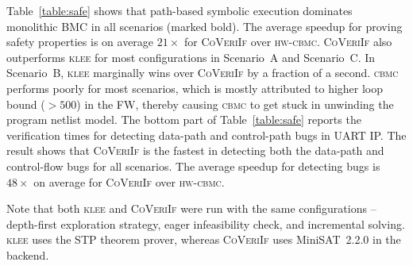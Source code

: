 \documentclass[sigconf]{acmart}
\newcommand{\tool}[1]{\textsc{#1}\xspace}
\newcommand{\cbmcv}{\tool{cbmc}}
\newcommand{\hwcbmcv}{\tool{hw-cbmc}}
\newcommand{\verifox}{\tool{CoVeriIf}}
\newcommand{\klee}{\tool{klee}}
\newcommand{\Omit}[1]{}
\begin{document}
Table~\ref{table:safe} shows that path-based symbolic execution dominates
monolithic BMC in all scenarios (marked bold).  The average speedup for
proving safety properties is on average $21\times$ for \verifox over
\hwcbmcv.  \verifox also outperforms \klee for most configurations in
Scenario~A and Scenario~C.  In Scenario~B, \klee marginally wins over
\verifox by a fraction of a second.  \cbmcv performs poorly for most
scenarios, which is mostly attributed to higher loop bound ($>500$) in the
FW, thereby causing \cbmcv to get stuck in unwinding the program netlist
model.  The bottom part of Table~\ref{table:safe} reports the verification
times for detecting data-path and control-path bugs in UART IP.  The result
shows that \verifox is the fastest in detecting both the data-path and
control-flow bugs for all scenarios.  The average speedup for detecting bugs
is $48\times$ on average for \verifox over \hwcbmcv.

Note that both \klee and \verifox were run with the same configurations --
depth-first exploration strategy, eager infeasibility check, and incremental
solving.  \klee uses the STP theorem prover, whereas \verifox uses
MiniSAT~2.2.0 in the backend.

\Omit
{Besides SAT backend, \verifox also have a SMT backend. We ran our 
experiments with Z3 and observe higher verification times for Z3 compared 
to MiniSAT. So, we do not report the verification with SMT solvers.   }
\end{document}
